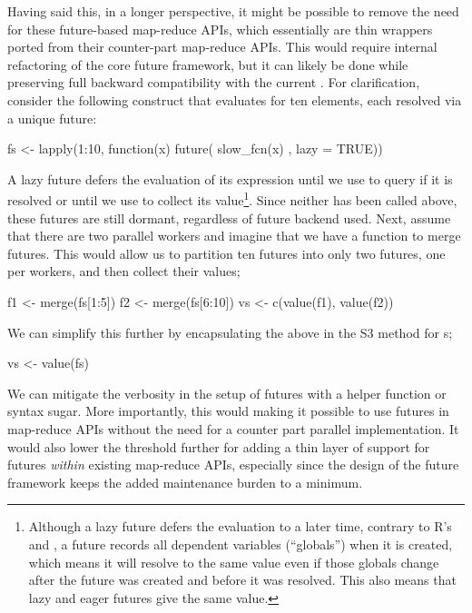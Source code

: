 Having said this, in a longer perspective, it might be possible to
remove the need for these future-based map-reduce APIs, which
essentially are thin wrappers ported from their counter-part
map-reduce APIs.  This would require internal refactoring of the core
future framework, but it can likely be done while preserving full
backward compatibility with the current .
%
For clarification, consider the following  construct
that evaluates  for ten elements, each resolved via
a unique  future:
\begin{example}
fs <- lapply(1:10, function(x) future({
  slow_fcn(x)
}, lazy = TRUE))
\end{example}
%
A lazy future defers the evaluation of its expression until we
use  to query if it is resolved or until we
use  to collect its value\footnote{Although a lazy
future defers the evaluation to a later time, contrary to
R's  and , a future records all
dependent variables (``globals'') when it is created, which means it
will resolve to the same value even if those globals change after the
future was created and before it was resolved.  This also means that
lazy and eager futures give the same value.}.  Since neither has been
called above, these futures are still dormant, regardless of future
backend used.  Next, assume that there are two parallel workers and
imagine that we have a function  to merge futures.  This
would allow us to partition ten futures into only two futures, one per
workers, and then collect their values;
\begin{example}
f1 <- merge(fs[1:5])
f2 <- merge(fs[6:10])
vs <- c(value(f1), value(f2))
\end{example}
We can simplify this further by encapsulating the above in the S3
method  for s;
\begin{example}
vs <- value(fs)
\end{example}
%
We can mitigate the verbosity in the setup of futures with a helper
function or syntax sugar.  More importantly, this would making it
possible to use futures in map-reduce APIs without the need for a
counter part parallel implementation.  It would also lower the
threshold further for adding a thin layer of support for
futures \emph{within} existing map-reduce APIs, especially since the
design of the future framework keeps the added maintenance burden to a
minimum.

